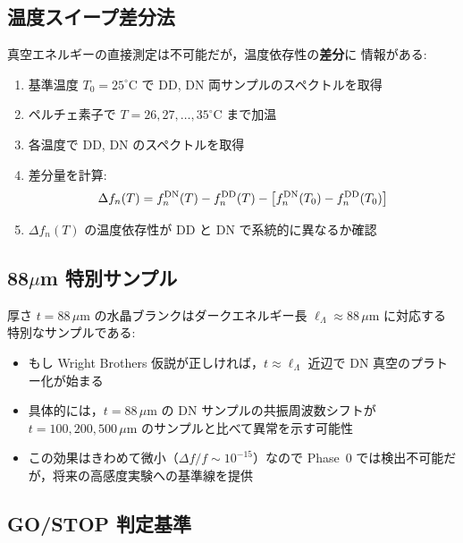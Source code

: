 \documentclass[11pt,a4paper]{article}
\begin{document}
\subsection{温度スイープ差分法}

真空エネルギーの直接測定は不可能だが，温度依存性の\textbf{差分}に
情報がある:

\begin{enumerate}
\item 基準温度 $T_0 = 25^\circ$C で DD, DN 両サンプルのスペクトルを取得
\item ペルチェ素子で $T = 26, 27, \ldots, 35^\circ$C まで加温
\item 各温度で DD, DN のスペクトルを取得
\item 差分量を計算:
\begin{equation}
\Delta f_n(T) = f_n^{\rm DN}(T) - f_n^{\rm DD}(T) - \left[f_n^{\rm DN}(T_0) - f_n^{\rm DD}(T_0)\right]
\end{equation}
\item $\Delta f_n(T)$ の温度依存性が DD と DN で系統的に異なるか確認
\end{enumerate}

\subsection{88$\mu$m 特別サンプル}

厚さ $t = 88\,\mu$m の水晶ブランクはダークエネルギー長
$\ell_\Lambda \approx 88\,\mu$m に対応する特別なサンプルである:

\begin{itemize}
\item もし Wright Brothers 仮説が正しければ，$t \approx \ell_\Lambda$ 近辺で
  DN 真空のプラトー化が始まる
\item 具体的には，$t = 88\,\mu$m の DN サンプルの共振周波数シフトが
  $t = 100, 200, 500\,\mu$m のサンプルと比べて異常を示す可能性
\item この効果はきわめて微小（$\Delta f / f \sim 10^{-15}$）なので
  Phase~0 では検出不可能だが，将来の高感度実験への基準線を提供
\end{itemize}

\subsection{GO/STOP 判定基準}
\end{document}
